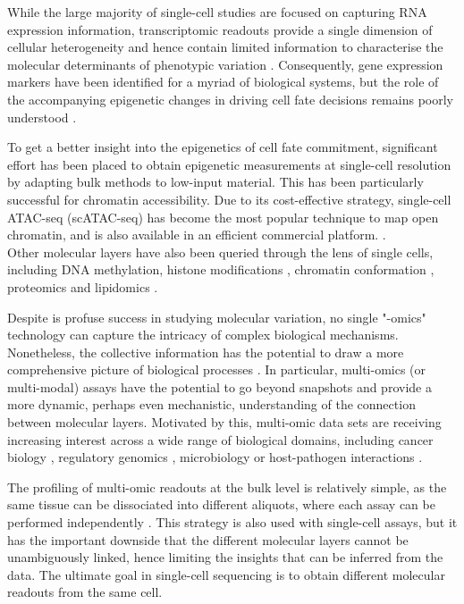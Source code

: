 While the large majority of single-cell studies are focused on capturing RNA expression information, transcriptomic readouts provide a single dimension of cellular heterogeneity and hence contain limited information to characterise the molecular determinants of phenotypic variation \cite{Ritchie2015}. Consequently, gene expression markers have been identified for a myriad of biological systems, but the role of the accompanying epigenetic changes in driving cell fate decisions remains poorly understood \cite{Griffiths2018,Kelsey2017,Bheda2014}.

To get a better insight into the epigenetics of cell fate commitment, significant effort has been placed to obtain epigenetic measurements at single-cell resolution by adapting bulk methods to low-input material. This has been particularly successful for chromatin accessibility. Due to its cost-effective strategy, single-cell ATAC-seq (scATAC-seq) has become the most popular technique to map open chromatin, and is also available in an efficient commercial platform. \cite{Cusanovich2015,Cao2018,Chen2018}.\\
Other molecular layers have also been queried through the lens of single cells, including DNA methylation\cite{Smallwood2014}, histone modifications \cite{Ku2019}, chromatin conformation \cite{Ku2019}, proteomics \cite{Specht2018} and lipidomics \cite{Thiele2019}.

Despite is profuse success in studying molecular variation, no single "-omics" technology can capture the intricacy of complex biological mechanisms. Nonetheless, the collective information has the potential to draw a more comprehensive picture of biological processes \cite{Hasin2017,Ritchie2015}. In particular, multi-omics (or multi-modal) assays have the potential to go beyond snapshots and provide a more dynamic, perhaps even mechanistic, understanding of the connection between molecular layers. Motivated by this, multi-omic data sets are receiving increasing interest across a wide range of biological domains, including cancer biology \cite{Akavia2010,Gerstung2015}, regulatory genomics \cite{Chen2016}, microbiology \cite{Kim2016} or host-pathogen interactions \cite{Soderholm2016}. 

The profiling of multi-omic readouts at the bulk level is relatively simple, as the same tissue can be dissociated into different aliquots, where each assay can be performed independently \cite{Ritchie2015}. This strategy is also used with single-cell assays, but it has the important downside that the different molecular layers cannot be unambiguously linked, hence limiting the insights that can be inferred from the data. The ultimate goal in single-cell sequencing is to obtain different molecular readouts from the same cell.

